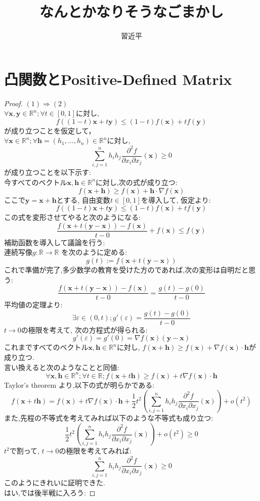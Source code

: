 \documentclass[dvipdfmx]{jsarticle}
\begin{document}
\title{なんとかなりそうなごまかし}
\author{習近平}
\maketitle
\newpage
\tableofcontents
{}
\newpage
\section{凸関数とPositive-Defined Matrix}
\begin{proof}
$(1) \Longrightarrow (2)$ \\
$\forall \bm{x}, \bm{y} \in \mathbb{R}^n ; \forall t \in [0,1]$に対し,
$$
f \left( (1-t)\bm{x} + t \bm{y} \right) \le (1-t)f(\bm{x}) + tf(\bm{y})
$$
が成り立つことを仮定して，\\
$\forall \bm{x} \in \mathbb{R}^n; \forall \bm{h} =(h_1, \ldots , h_n) \in \mathbb{R}^n$に対し, 
$$
\sum_{i,j=1}^{n}h_i h_j \frac{\partial^2 f}{\partial x_i \partial x_j}(\bm{x}) \ge 0
$$
が成り立つことを以下示す:\\
今すべてのベクトル$\bm{x},\bm{h} \in \mathbb{R}^n$に対し,次の式が成り立つ:
$$
f(\bm{x} + \bm{h}) \ge f(\bm{x}) + \bm{h} \cdot \nabla f(\bm{x})
$$
ここで$\bm{y} = \bm{x} + \bm{h}$とする, 自由変数$t \in [0,1]$を導入して, 仮定より:
$$f \left( (1-t)\bm{x} + t \bm{y} \right) \le (1-t)f(\bm{x}) + tf(\bm{y})$$
この式を変形させてやると次のようになる:
$$
	\frac{f(\bm{x} + t(\bm{y} - \bm{x}))-f(\bm{x})}{t-0} +f(\bm{x}) \le f(\bm{y})
$$
補助函数を導入して議論を行う:\\
連続写像$g: \mathbb{R} \to \mathbb{R}$ を次のように定める:
$$
g(t) := f(\bm{x} + t(\bm{y} - \bm{x}))
$$
これで準備が完了,多少数学の教育を受けた方のであれば,次の変形は自明だと思う:
$$
\frac{f(\bm{x} + t(\bm{y} - \bm{x}))-f(\bm{x})}{t-0} = \frac{g(t) - g(0)}{t-0}
$$
平均値の定理より:
$$
\exists \varepsilon \in (0,t); g'(\varepsilon ) =\frac{g(t) - g(0)}{t-0}
$$
$ t \to 0$の極限を考えて, 次の方程式が得られる:
$$
g'(\varepsilon) = g'(0) = \nabla f(\bm{x}) (\bm{y} - \bm{x})
$$
これまですべてのベクトル$\bm{x} ,\bm{h} \in \mathbb{R}^n$に対し, $f(\bm{x}+ \bm{h}) \ge f(\bm{x} ) + \nabla f(\bm{x})\cdot \bm{h}$が成り立つ.\\
言い換えると次のようなことと同値:
$$
\forall \bm{x} ,\bm{h} \in \mathbb{R}^n; \forall t \in \mathbb{R}; f(\bm{x}+t\bm{h} ) \ge f(\bm{x}) + t \nabla f(\bm{x}) \cdot \bm{h}
$$
Taylor's theorem より,以下の式が明らかである:
$$
f(\bm{x}+t\bm{h} ) =  f(\bm{x}) + t \nabla f(\bm{x}) \cdot \bm{h} + \frac{1}{2} t^2 \left( \sum_{i,j =1}^n h_i h_j \frac{\partial^2 f}{\partial x_i \partial x_j}(\bm{x}) \right) + o(t^2)
$$
また,先程の不等式を考えてみれば以下のような不等式も成り立つ:
$$
\frac{1}{2} t^2 \left( \sum_{i,j =1}^n h_i h_j \frac{\partial^2 f}{\partial x_i \partial x_j}(\bm{x}) \right) + o(t^2) \ge 0
$$
$t^2$で割って, $t \to 0$の極限を考えてみれば:
$$
	\sum_{i,j =1}^n h_i h_j \frac{\partial^2 f}{\partial x_i \partial x_j}(\bm{x})\ge 0
$$
このようにきれいに証明できた.\\

\noindent はい,では後半戦に入ろう:
\end{proof}
\end{document}
